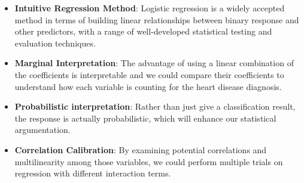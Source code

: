 \documentclass[
  11pt,
]{article}
\begin{document}
\begin{itemize}
\item
  \textbf{Intuitive Regression Method}: Logistic regression is a widely
  accepted method in terms of building linear relationships between
  binary response and other predictors, with a range of well-developed
  statistical testing and evaluation techniques.
\item
  \textbf{Marginal Interpretation}: The advantage of using a linear
  combination of the coefficients is interpretable and we could compare
  their coefficients to understand how each variable is counting for the
  heart disease diagnosis.
\item
  \textbf{Probabilistic interpretation}: Rather than just give a
  classification result, the response is actually probabilistic, which
  will enhance our statistical argumentation.
\item
  \textbf{Correlation Calibration}: By examining potential correlations
  and multilinearity among those variables, we could perform multiple
  trials on regression with different interaction terms.
\end{itemize}
\end{document}
